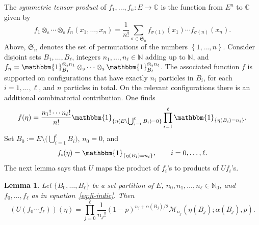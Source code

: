 \documentclass[10pt,a4paper]{amsart}
\numberwithin{equation}{section}
\newtheorem{Lemma}[Theorem]{Lemma}
\newcommand{\N}{\mathbb{N}}
\newcommand{\C}{\mathbb{C}}
\newcommand{\set}[1]{{\left \{ #1 \right \}}}
\newcommand{\1}{\mathbbm{1}}
\begin{document}
The \emph{symmetric tensor product} of $f_1,\ldots, f_n\colon E\to \C$ is the function from $E^n$ to $\C$ given by
\[
	f_1\otimes_\mathrm s \cdots \otimes_\mathrm s f_n(x_1,\ldots,x_n) = \frac{1}{n!}\sum_{\sigma\in \mathfrak S_n} f_{\sigma(1)}(x_1)\cdots f_{\sigma(n)}(x_n).
\]
Above, $\mathfrak{S}_n$ denotes the set of permutations of the numbers $\set{1, \ldots, n}$.
Consider disjoint sets $B_1,\ldots, B_\ell$, integers $n_1,\ldots, n_\ell\in \N$ adding up to $\N$, and $f_n =\1_{B_1}^{\otimes_\mathrm s n_1} \otimes_\mathrm s \cdots \otimes_\mathrm s \1_{B_\ell}^{\otimes_\mathrm s n_\ell}$. The associated function $f$ is supported on configurations that have exactly $n_i$ particles in $B_i$, for each $i=1,\ldots,\ell$, and $n$ particles in total. On the relevant configurations there is an additional combinatorial contribution. One finds
\begin{equation}\label{eq:tenso-indic}
	f(\eta) = \frac{n_1!\cdots n_\ell!}{n!} \1_{\{\eta(E\setminus \bigcup_{i=1}^\ell B_i)=0\}} \prod_{i=1}^\ell\1_{\{\eta(B_i) = n_i\}}.
\end{equation}
Set $B_0:= E\setminus \bigl(\bigcup_{i=1}^\ell B_i\bigr)$, $n_0=0$, and
\begin{equation} \label{eq:fi-indic}
	f_i(\eta) = \1_{\{\eta(B_i)=n_i \}},\qquad i =0,\ldots,\ell.
\end{equation}
The next lemma says that $U$ maps the product of $f_i$'s to products of $U f_i$'s.

\begin{Lemma} \label{lem:tensorize}
	Let $\{B_0,\ldots, B_{\ell}\}$ be a set partition of $E$, $n_0,n_1,\ldots,n_\ell \in \N_0$, and $f_0,\ldots,f_\ell$ as in equation~\eqref{eq:fi-indic}. Then
	\[
		( U (f_0\cdots f_\ell)) (\eta) =\prod_{j=0}^\ell \frac{1}{n_j!} (1-p)^{n_j+ \alpha(B_j)/2 } \mathcal M_{n_j}( \eta(B_j);\alpha(B_j), p).
	\] 	
\end{Lemma}
\end{document}
